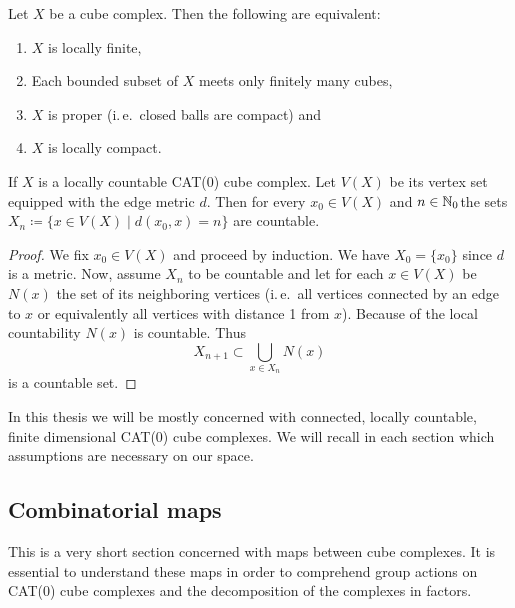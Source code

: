 \begin{prop}
  Let \(X\) be a cube complex. Then the following are equivalent:
  \begin{enumerate}
  \item \(X\) is locally finite,
  \item Each bounded subset of \(X\) meets only finitely many cubes,
  \item \(X\) is proper (i.\,e.\ closed balls are compact) and
  \item \(X\) is locally compact.
  \end{enumerate}
\end{prop}

\begin{lemma}
  \label{lem:lf-countable}
  If \(X\) is a locally countable CAT(0) cube complex. Let \(V(X)\) be its vertex set equipped with the edge metric \(d\). Then for every \(x_0 \in V(X)\) and \(n \in \mathbb{N}_0\)the sets \(X_n \coloneqq \{x \in V(X) \mid d(x_0, x) = n\}\) are countable.
\end{lemma}

\begin{proof}
  We fix \(x_0 \in V(X)\) and proceed by induction. We have \(X_0 = \{x_0\}\) since \(d\) is a metric. Now, assume \(X_n\) to be countable and let for each \(x \in V(X)\) be \(N(x)\) the set of its neighboring vertices (i.\,e.\ all vertices connected by an edge to \(x\) or equivalently all vertices with distance 1 from \(x\)). Because of the local countability \(N(x)\) is countable. Thus
  \[
    X_{n+1} \subset \bigcup_{x \in X_n} N(x)
  \]
  is a countable set.
\end{proof}

\begin{rem}
  In this thesis we will be mostly concerned with connected, locally countable, finite dimensional CAT(0) cube complexes. We will recall in each section which assumptions are necessary on our space.
\end{rem}

\subsection{Combinatorial maps}
\label{sec:comb-map}

This is a very short section concerned with maps between cube complexes. It is essential to understand these maps in order to comprehend group actions on CAT(0) cube complexes and the decomposition of the complexes in factors.

